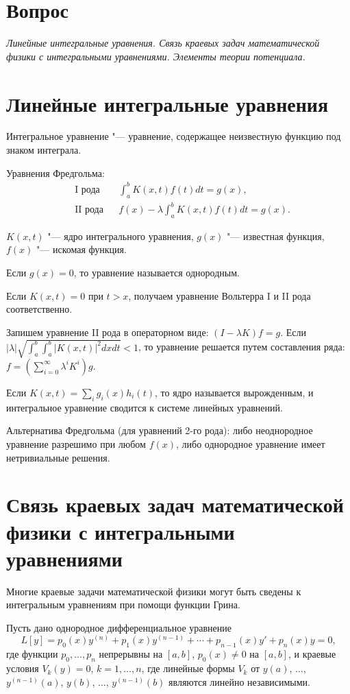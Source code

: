 \documentclass[a4paper,12pt]{article}
\begin{document}
\section*{Вопрос }
{\em Линейные интегральные уравнения. Связь краевых задач
математической физики с интегральными уравнениями.
Элементы теории потенциала.}


\section{Линейные интегральные уравнения}

Интегральное уравнение "--- уравнение, содержащее неизвестную функцию
под знаком интеграла.

Уравнения Фредгольма:
\begin{align*}
&\text{I рода}&&\int_a^b K(x,t)f(t)dt=g(x),\\
&\text{II рода}&&f(x)-\lambda\int_a^b K(x,t)f(t)dt=g(x).
\end{align*}

$K(x,t)$ "--- ядро интегрального уравнения, $g(x)$ "---
известная функция, $f(x)$ "--- искомая функция.

Если $g(x)=0$, то уравнение называется однородным.

Если $K(x,t)=0$ при $t>x$, получаем уравнение Вольтерра
I и II рода соответственно.

Запишем уравнение II рода в операторном виде: $(I-\lambda K)f=g$.
Если $|\lambda|\sqrt{\int_a^b\int_a^b|K(x,t)|^2dxdt}<1$, то
уравнение решается путем составления ряда:
$f=(\sum_{i=0}^\infty \lambda^i K^i)g$.

Если $K(x,t)=\sum_i g_i(x)h_i(t)$, то ядро называется вырожденным,
и интегральное уравнение сводится к системе линейных уравнений.


Альтернатива Фредгольма (для уравнений 2-го рода): либо неоднородное
уравнение разрешимо при любом $f(x)$, либо однородное уравнение имеет
нетривиальные решения.


\section{Связь краевых задач математической физики
с интегральными уравнениями}

Многие краевые задачи математической физики могут быть сведены
к интегральным уравнениям при помощи функции Грина.

Пусть дано однородное дифференциальное уравнение
$$L[y]=p_0(x)y^{(n)}+p_1(x)y^{(n-1)}+\cdots+p_{n-1}(x)y'+p_n(x)y=0,$$
где функции $p_0,\dots,p_n$ непрерывны на $[a,b]$, $p_0(x)\ne0$ на
$[a,b]$, и краевые условия $V_k(y)=0$, $k=1,\dots,n$, где линейные
формы $V_k$ от $y(a)$, $\dots$, $y^{(n-1)}(a)$, $y(b)$, $\dots$,
$y^{(n-1)}(b)$ являются линейно независимыми.
\end{document}
